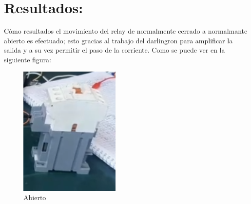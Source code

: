 \documentclass[letterpaper]{article}
\begin{document}
\section{Resultados:}
Cómo resultados el movimiento del relay de normalmente cerrado a normalmante abierto es efectuado; esto gracias al trabajo del darlingron para amplificar la salida y a su vez permitir el paso de la corriente. 
Como se puede ver en la siguiente figura:\\
\begin{figure}[htbp]
    \centering
    \includegraphics[width=5cm]{IMG/releisoteOn.PNG}
    \caption{Abierto}
    \label{fig:On}
\end{figure}
\end{document}
